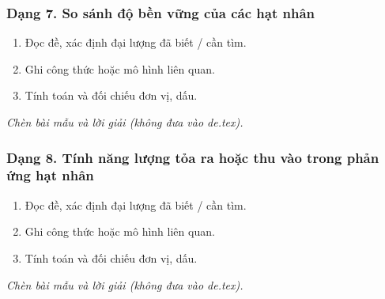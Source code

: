 \subsubsection{Dạng 7. So sánh độ bền vững của các hạt nhân}
\begin{phuongphap}
\begin{enumerate}
\item Đọc đề, xác định đại lượng đã biết / cần tìm.
\item Ghi công thức hoặc mô hình liên quan.
\item Tính toán và đối chiếu đơn vị, dấu.
\end{enumerate}
\end{phuongphap}
\begin{vidumau}
\textit{Chèn bài mẫu và lời giải (không đưa vào de.tex).}
\end{vidumau}

\subsubsection{Dạng 8. Tính năng lượng tỏa ra hoặc thu vào trong phản ứng hạt nhân}
\begin{phuongphap}
\begin{enumerate}
\item Đọc đề, xác định đại lượng đã biết / cần tìm.
\item Ghi công thức hoặc mô hình liên quan.
\item Tính toán và đối chiếu đơn vị, dấu.
\end{enumerate}
\end{phuongphap}
\begin{vidumau}
\textit{Chèn bài mẫu và lời giải (không đưa vào de.tex).}
\end{vidumau}

